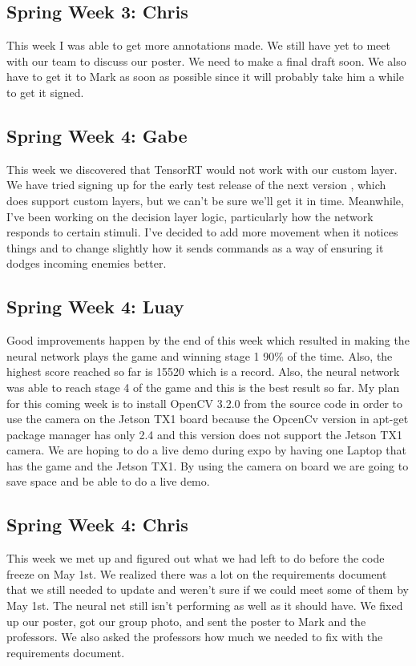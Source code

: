 \documentclass[onecolumn, draftclsnofoot,10pt, compsoc]{IEEEtran}
\begin{document}
\subsection{Spring Week 3: Chris}
This week I was able to get more annotations made. We still have yet to meet with our team to discuss our poster. We need to make a final draft soon. We also have to get it to Mark as soon as possible since it will probably take him a while to get it signed.
\subsection{Spring Week 4: Gabe}
This week we discovered that TensorRT would not work with our custom layer. We have tried signing up for the early test release of the next version , which does support custom layers, but we can't be sure we'll get it in time. Meanwhile, I've been working on the decision layer logic, particularly how the network responds to certain stimuli. I've decided to add more movement when it notices things and to change slightly how it sends commands as a way of ensuring it dodges incoming enemies better.
\subsection{Spring Week 4: Luay}
Good improvements happen by the end of this week which resulted in making the neural network plays the game and winning stage 1 90\% of the time. Also, the highest score reached so far is 15520 which is a record. Also, the neural network was able to reach stage 4 of the game and this is the best result so far.
\newline\newline
My plan for this coming week is to install OpenCV 3.2.0 from the source code in order to use the camera on the Jetson TX1 board because the OpcenCv version in apt-get package manager has only 2.4 and this version does not support the Jetson TX1 camera. We are hoping to do a live demo during expo by having one Laptop that has the game and the Jetson TX1. By using the camera on board we are going to save space and be able to do a live demo.
\subsection{Spring Week 4: Chris}
This week we met up and figured out what we had left to do before the code freeze on May 1st. We realized there was a lot on the requirements document that we still needed to update and weren't sure if we could meet some of them by May 1st. The neural net still isn't performing as well as it should have. We fixed up our poster, got our group photo, and sent the poster to Mark and the professors. We also asked the professors how much we needed to fix with the requirements document.
\end{document}
